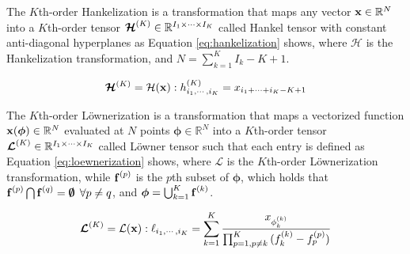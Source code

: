 \documentclass[sensors,article,submit,moreauthors,pdftex]{Definitions/mdpi}
\newcommand{\mathvec}[1]{\boldsymbol{\mathbf{\MakeLowercase{#1}}}}
\newcommand{\mathten}[1]{\boldsymbol{\mathbf{\mathcal{\MakeUppercase{#1}}}}}
\providecommand{\DIFdelbegin}{} %
\providecommand{\DIFdelend}{} %
\begin{document}
\DIFdelbegin %


\DIFdelend \begin{Definition}
	\label{def:hankeltrans}
	The $K$th-order Hankelization is a transformation that maps any vector $\mathvec{x}\in\mathbb{R}^N$ into a $K$th-order tensor $\mathten{H}^{(K)} \in\mathbb{R}^{I_1 \times \cdots \times I_K}$ called Hankel tensor with constant anti-diagonal hyperplanes as Equation \ref{eq:hankelization} shows, where $\mathcal{H}$ is the Hankelization transformation, and $N = \sum_{k=1}^{K} {I_k} - K + 1$.

	\begin{equation}
	\mathten{H}^{(K)} = \mathcal{H}(\mathvec{x}) :  h^{(K)}_{i_1,\cdots,i_K} = x_{i_1 + \cdots + i_K - K + 1} %
	\label{eq:hankelization}
	\end{equation}
\end{Definition}

\begin{Definition}
	\label{def:loewnertrans}
	The $K$th-order L{\"o}wnerization is a transformation that maps a vectorized function $\mathvec{x}(\boldsymbol{\phi})\in\mathbb{R}^N$ evaluated at $N$ points $\boldsymbol{\phi}\in\mathbb{R}^{N}$ into a $K$th-order tensor $\mathten{L}^{(K)} \in \mathbb{R}^{I_1 \times \cdots \times I_K}$ called L{\"o}wner tensor such that each entry is defined as Equation \ref{eq:loewnerization} shows, where $\mathcal{L}$ is the $K$th-order L{\"o}wnerization transformation, while $\mathvec{f}^{(p)}$ is the $p$th subset of $\boldsymbol{\phi}$, which holds that  $\mathvec{f}^{(p)} \bigcap \mathvec{f}^{(q)} = \boldsymbol{\emptyset} \:\:\forall p \neq q$, and $\boldsymbol{\phi}=\bigcup_{k=1}^{K} {\mathvec{f}^{(k)}}$.

	\begin{equation}
	\mathten{L}^{(K)} = \mathcal{L}(\mathvec{x}) : \ell_{i_1,\cdots,i_K} = \sum_{k=1}^{K}{ \frac{x_{\phi_{k}^{(k)}}}{\prod_{p=1,p\neq k}^{K}{(f_{k}^{(k)} - f_p^{(p)})}}}
	\label{eq:loewnerization}
	\end{equation}
\end{Definition}
\end{document}
